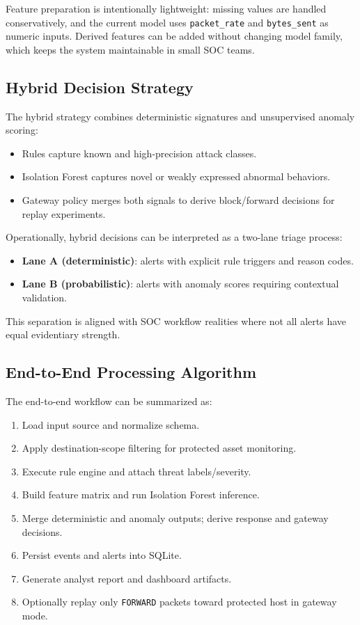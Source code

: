 \documentclass[conference]{IEEEtran}
\begin{document}
Feature preparation is intentionally lightweight: missing values are handled conservatively, and the current model uses \texttt{packet\_rate} and \texttt{bytes\_sent} as numeric inputs. Derived features can be added without changing model family, which keeps the system maintainable in small SOC teams.

\subsection{Hybrid Decision Strategy}
The hybrid strategy combines deterministic signatures and unsupervised anomaly scoring:
\begin{itemize}
    \item Rules capture known and high-precision attack classes.
    \item Isolation Forest captures novel or weakly expressed abnormal behaviors.
    \item Gateway policy merges both signals to derive block/forward decisions for replay experiments.
\end{itemize}

Operationally, hybrid decisions can be interpreted as a two-lane triage process:
\begin{itemize}
    \item \textbf{Lane A (deterministic)}: alerts with explicit rule triggers and reason codes.
    \item \textbf{Lane B (probabilistic)}: alerts with anomaly scores requiring contextual validation.
\end{itemize}

This separation is aligned with SOC workflow realities where not all alerts have equal evidentiary strength.

\subsection{End-to-End Processing Algorithm}
The end-to-end workflow can be summarized as:
\begin{enumerate}
    \item Load input source and normalize schema.
    \item Apply destination-scope filtering for protected asset monitoring.
    \item Execute rule engine and attach threat labels/severity.
    \item Build feature matrix and run Isolation Forest inference.
    \item Merge deterministic and anomaly outputs; derive response and gateway decisions.
    \item Persist events and alerts into SQLite.
    \item Generate analyst report and dashboard artifacts.
    \item Optionally replay only \texttt{FORWARD} packets toward protected host in gateway mode.
\end{enumerate}
\end{document}
